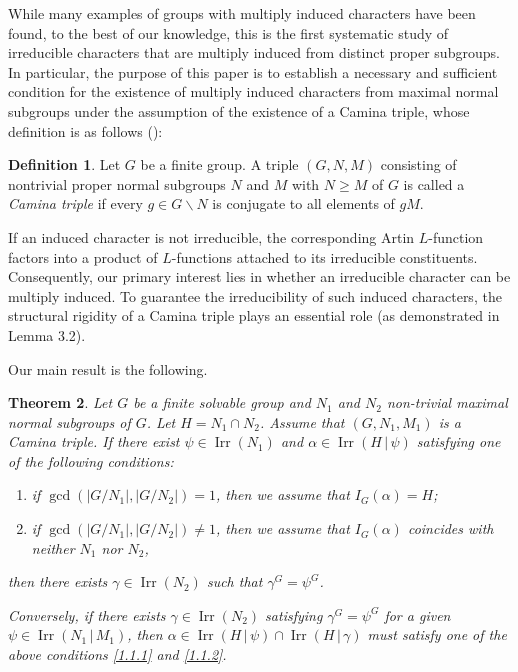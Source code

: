 \documentclass[a4paper,12pt]{article}
\newtheorem{theorem}{Theorem}[section]
\theoremstyle{definition}
\newtheorem{definition}[theorem]{Definition}
\theoremstyle{remark}
\DeclareMathOperator{\irr}{Irr}
\numberwithin{equation}{section}
\begin{document}
While many examples of groups with multiply induced characters have been found, 
to the best of our knowledge, 
this is the first systematic study of irreducible characters 
that are multiply induced from distinct proper subgroups.
In particular, the purpose of this paper is 
to establish a necessary and sufficient condition for the existence of 
multiply induced characters from maximal normal subgroups 
under the assumption of the existence of a Camina triple,
whose definition is as follows (\cite{MR3150725}):

\begin{definition} \label{def:1.1}
    Let $G$ be a finite group.
A triple $(G, N, M)$ consisting of nontrivial proper normal subgroups $N$ and $M$ with $N \ge M$ of $G$ is 
called a \emph{Camina triple} if every $g \in G \backslash N$ is conjugate to all elements of $gM$.
\end{definition}

If an induced character is not irreducible,
the corresponding Artin $L$-function factors into a product of $L$-functions attached
 to its irreducible constituents. 
 Consequently, our primary interest lies in whether an irreducible character 
 can be multiply induced. 
 To guarantee the irreducibility of such induced characters,
  the structural rigidity of a Camina triple plays an essential role
   (as demonstrated in Lemma 3.2).


Our main result is the following.
\begin{theorem} \label{thm:1.1}
    Let $G$ be a finite solvable group and $N_1$ and $N_2$ non-trivial maximal normal subgroups 
    of $G$. Let $H=N_1 \cap N_2$.
    Assume that $(G,N_1, M_1)$ is a Camina triple. If
    there exist $\psi \in \irr (N_1 ) $ and $\alpha \in \irr ( H  \,|\, \psi)$
    satisfying one of the following conditions:
    \begin{enumerate}
        \item \label{1.1.1} if $\gcd (|G/N_1|, |G/N_2 |)=1$, then we assume that $I_G (\alpha ) =H$;
        \item \label{1.1.2} if $\gcd (|G/N_1|, |G/N_2 |) \ne 1$, then we assume that $I_G (\alpha )$ coincides with neither 
        $N_1$ nor $N_2$,
    \end{enumerate}
 then there exists $\gamma \in \irr (N_2)$ such that $\gamma^G = \psi^G$.

 Conversely, if there exists $\gamma \in \irr (N_2)$ satisfying $\gamma^G = \psi^G$ for a given $\psi \in \irr (N_1 \, | \, M_1)$, then
  $\alpha \in \irr (H \, | \, \psi) \cap \irr (H \, | \, \gamma ) $ must satisfy one of the above conditions \ref{1.1.1} and \ref{1.1.2}.
\end{theorem}
\end{document}
